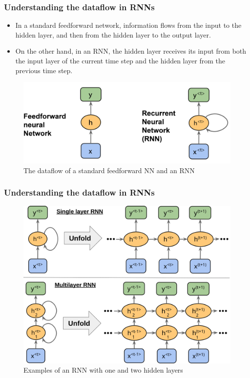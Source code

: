 \documentclass[11pt,]{beamer}
\begin{document}
\begin{frame}
    \frametitle{Understanding the dataflow in RNNs}
    \begin{itemize}
        \item In a standard feedforward network, information flows from the input to the hidden layer, and then from the hidden layer to the output layer. 
        \item On the other hand, in an RNN, the hidden layer receives its input from both the input layer of the current time step and the hidden layer from the previous time step.
    \end{itemize}
        \begin{figure}[h]
        \centering
        \includegraphics[scale=0.3]{Images/dataflow.png}
        \caption{The dataflow of a standard feedforward NN and an RNN}
    \end{figure}
\end{frame}
\begin{frame}
    \frametitle{Understanding the dataflow in RNNs}
    \begin{figure}
        \centering
        \includegraphics[]{Images/sing_mul.svg}
        \caption{Examples of an RNN with one and two hidden layers}
        \label{fig:enter-label}
    \end{figure}
\end{frame}
\end{document}
